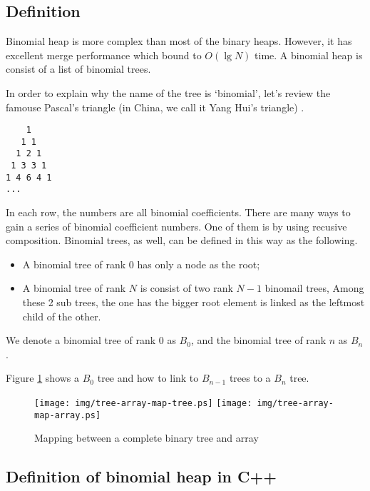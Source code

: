 \documentclass{article}
\begin{document}
\subsection{Definition}

Binomial heap is more complex than most of the binary heaps. However,
it has excellent merge performance which bound to $O(\lg N)$ time. A
binomial heap is consist of a list of binomial trees.

In order to explain why the name of the tree is `binomial', let's review
the famouse Pascal's triangle (in China, we call it Yang Hui's triangle)
\cite{wiki-pascal-triangle}.

\begin{verbatim}
    1
   1 1
  1 2 1
 1 3 3 1
1 4 6 4 1
...
\end{verbatim}

In each row, the numbers are all binomial coefficients. There are many
ways to gain a series of binomial coefficient numbers. One of them is
by using recusive composition. Binomial trees, as well, can be defined
in this way as the following.

\begin{itemize}
\item A binomial tree of rank 0 has only a node as the root;
\item A binomial tree of rank $N$ is consist of two rank $N-1$ binomail trees,
Among these 2 sub trees, the one has the bigger root element is linked as the
leftmost child of the other.
\end{itemize}

We denote a binomial tree of rank 0 as $B_0$, and the binomial tree of rank
$n$ as $B_n$.

Figure \ref{fig:link-bitree} shows a $B_0$ tree and how to link to $B_{n-1}$
trees to a $B_n$ tree.

\begin{figure}[htbp]
       \begin{center}
       	  \texttt{[image: img/tree-array-map-tree.ps]}
          \texttt{[image: img/tree-array-map-array.ps]}
        \caption{Mapping between a complete binary tree and array} \label{fig:link-bitree}
       \end{center}
\end{figure}

\subsection*{Definition of binomial heap in C++}
\end{document}
